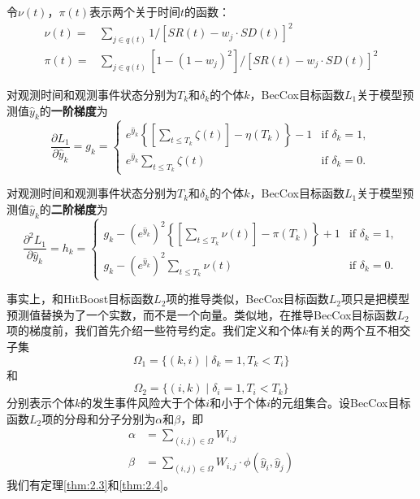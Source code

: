 \begin{definition}\label{def:2}
令$\nu(t)$，$\pi(t)$表示两个关于时间$t$的函数：\[
\begin{split}
\nu(t) =& \sum_{j\in q(t)} 1/[SR(t) - w_j\cdot SD(t)]^2 \\
\pi(t)  =& \sum_{j\in q(t)} [1-(1-w_j)^2]/[SR(t) - w_j\cdot SD(t)]^2
\end{split}
\]
\end{definition}

\begin{theorem}\label{thm:2.1}
对观测时间和观测事件状态分别为$T_k$和$\delta_k$的个体$k$，BecCox目标函数$L_1$关于模型预测值$\hat{y}_k$的\textbf{一阶梯度}为$$
\frac{\partial L_1}{\partial \hat{y}_k} = g_k = 
\begin{cases}
e^{\hat{y}_k} \left\{ \left[\sum_{t\le T_k} \zeta(t)\right] - \eta(T_k) \right\} - 1 & \text{if } \delta_k = 1,\\
e^{\hat{y}_k} \sum_{t\le T_k} \zeta(t) & \text{if } \delta_k = 0.
\end{cases}
$$
\end{theorem}

\begin{theorem}\label{thm:2.2}
对观测时间和观测事件状态分别为$T_k$和$\delta_k$的个体$k$，BecCox目标函数$L_1$关于模型预测值$\hat{y}_k$的\textbf{二阶梯度}为$$
\frac{\partial^2 L_1}{\partial \hat{y}_k} = h_k = 
\begin{cases}
g_k - (e^{\hat{y}_k})^2 \left\{ \left[\sum_{t\le T_k} \nu(t)\right] - \pi(T_k) \right\} + 1 & \text{if } \delta_k = 1,\\
g_k - (e^{\hat{y}_k})^2 \sum_{t\le T_k} \nu(t) & \text{if } \delta_k = 0.
\end{cases}
$$
\end{theorem}

事实上，和HitBoost目标函数$L_2$项的推导类似，BecCox目标函数$L_2$项只是把模型预测值替换为了一个实数，而不是一个向量。类似地，在推导BecCox目标函数$L_2$项的梯度前，我们首先介绍一些符号约定。我们定义和个体$k$有关的两个互不相交子集
\begin{equation}
\Omega_1=\{(k,i) \mid \delta_k=1,T_k < T_i\}
\end{equation}
和
\begin{equation}
\Omega_2=\{(i,k) \mid \delta_i=1,T_i < T_k\}
\end{equation}
分别表示个体$k$的发生事件风险大于个体$i$和小于个体$i$的元组集合。设BecCox目标函数$L_2$项的分母和分子分别为$\alpha$和$\beta$，即
\begin{equation}
\begin{split}
\alpha &= \sum_{(i,j)\in \Omega} W_{i,j}\\
\beta &= \sum_{(i,j)\in \Omega} W_{i,j} \cdot \phi\left(\hat{y}_i, \hat{y}_j \right)
\end{split}
\end{equation}
我们有定理\ref{thm:2.3}和\ref{thm:2.4}。

